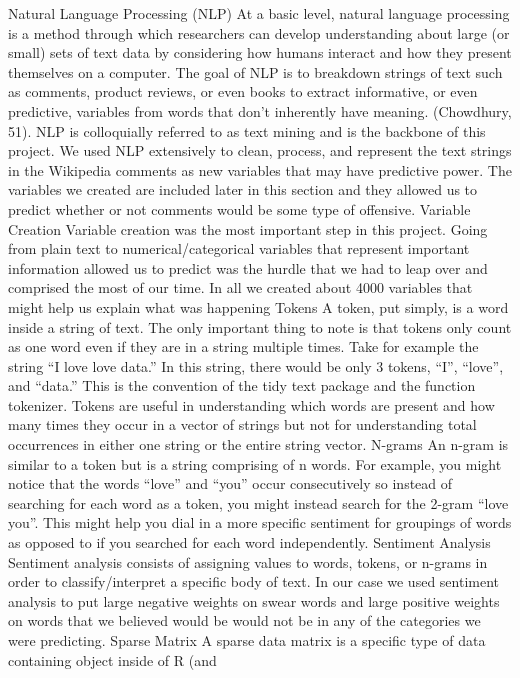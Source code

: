\documentclass[]{article}
\begin{document}
Natural Language Processing (NLP) At a basic level, natural language
processing is a method through which researchers can develop
understanding about large (or small) sets of text data by considering
how humans interact and how they present themselves on a computer. The
goal of NLP is to breakdown strings of text such as comments, product
reviews, or even books to extract informative, or even predictive,
variables from words that don't inherently have meaning. (Chowdhury,
51). NLP is colloquially referred to as text mining and is the backbone
of this project. We used NLP extensively to clean, process, and
represent the text strings in the Wikipedia comments as new variables
that may have predictive power. The variables we created are included
later in this section and they allowed us to predict whether or not
comments would be some type of offensive. Variable Creation Variable
creation was the most important step in this project. Going from plain
text to numerical/categorical variables that represent important
information allowed us to predict was the hurdle that we had to leap
over and comprised the most of our time. In all we created about 4000
variables that might help us explain what was happening Tokens A token,
put simply, is a word inside a string of text. The only important thing
to note is that tokens only count as one word even if they are in a
string multiple times. Take for example the string ``I love love data.''
In this string, there would be only 3 tokens, ``I'', ``love'', and
``data.'' This is the convention of the tidy text package and the
function tokenizer. Tokens are useful in understanding which words are
present and how many times they occur in a vector of strings but not for
understanding total occurrences in either one string or the entire
string vector. N-grams An n-gram is similar to a token but is a string
comprising of n words. For example, you might notice that the words
``love'' and ``you'' occur consecutively so instead of searching for
each word as a token, you might instead search for the 2-gram ``love
you''. This might help you dial in a more specific sentiment for
groupings of words as opposed to if you searched for each word
independently. Sentiment Analysis Sentiment analysis consists of
assigning values to words, tokens, or n-grams in order to
classify/interpret a specific body of text. In our case we used
sentiment analysis to put large negative weights on swear words and
large positive weights on words that we believed would be would not be
in any of the categories we were predicting. Sparse Matrix A sparse data
matrix is a specific type of data containing object inside of R (and
\end{document}
